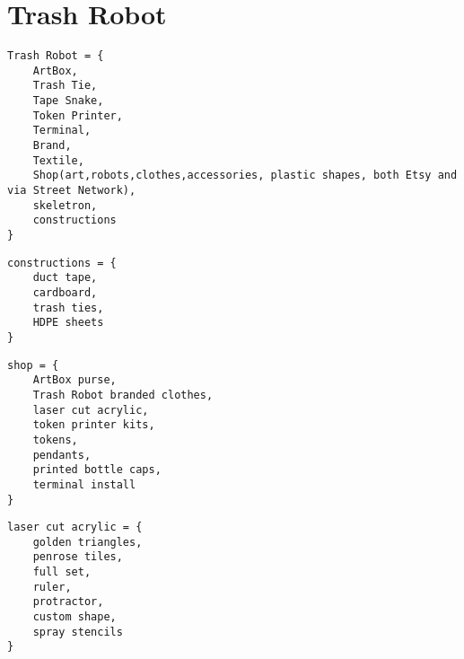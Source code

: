 \section{Trash Robot}

\begin{verbatim}
Trash Robot = {
    ArtBox,
    Trash Tie,
    Tape Snake,
    Token Printer,
    Terminal,
    Brand,
    Textile,
    Shop(art,robots,clothes,accessories, plastic shapes, both Etsy and via Street Network),
    skeletron,
    constructions
}
\end{verbatim}
    
\begin{verbatim}
constructions = {
    duct tape, 
    cardboard, 
    trash ties, 
    HDPE sheets
}
\end{verbatim}
\begin{verbatim}
shop = {
    ArtBox purse, 
    Trash Robot branded clothes, 
    laser cut acrylic, 
    token printer kits,
    tokens,
    pendants,
    printed bottle caps,
    terminal install
}
\end{verbatim}

\begin{verbatim}
laser cut acrylic = {
    golden triangles, 
    penrose tiles, 
    full set, 
    ruler,
    protractor,
    custom shape,
    spray stencils
}
\end{verbatim}